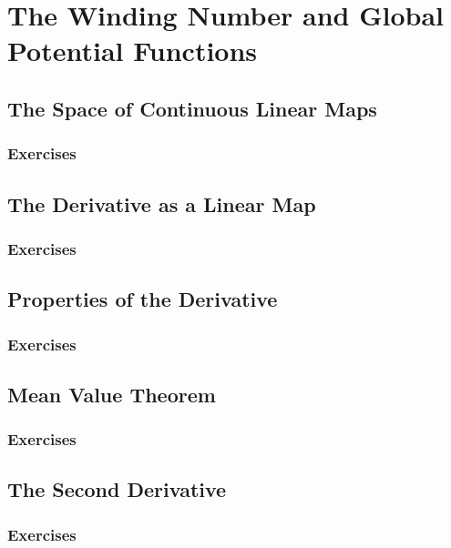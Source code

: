\setcounter{chapter}{0}
\renewcommand{\thechapter}{17}
\chapter{The Winding Number and Global Potential Functions}\label{ch:17}
\setcounter{equation}{0}	        %

\section{The Space of Continuous Linear Maps}\label{sec:17.1}
\subsection*{Exercises}\label{sec:17.1_Exercises}
\section{The Derivative as a Linear Map}\label{sec:17.2}	
\subsection*{Exercises}\label{sec:17.2_Exercises}
\section{Properties of the Derivative}\label{sec:17.3}	
\subsection*{Exercises}\label{sec:17.3_Exercises}
\section{Mean Value Theorem}\label{sec:17.4}	
\subsection*{Exercises}\label{sec:17.4_Exercises}
\section{The Second Derivative}\label{sec:17.5}	
\subsection*{Exercises}\label{sec:17.5_Exercises}
